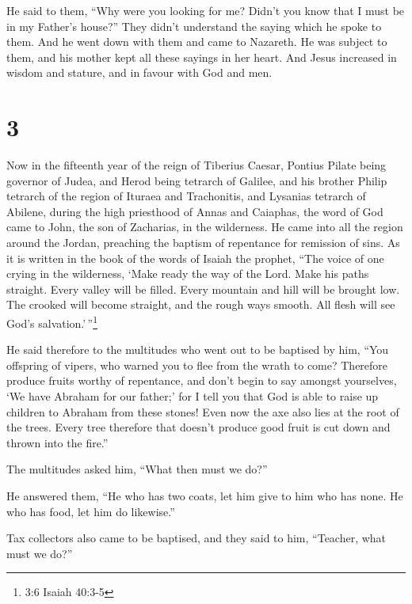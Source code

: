  He said to them, ``Why were you looking for me? Didn't you
know that I must be in my Father's house?''  They didn't
understand the saying which he spoke to them.  And he went
down with them and came to Nazareth. He was subject to them, and his
mother kept all these sayings in her heart.  And Jesus
increased in wisdom and stature, and in favour with God and men.

\hypertarget{section-2}{%
\section{3}\label{section-2}}

 Now in the fifteenth year of the reign of Tiberius Caesar,
Pontius Pilate being governor of Judea, and Herod being tetrarch of
Galilee, and his brother Philip tetrarch of the region of Ituraea and
Trachonitis, and Lysanias tetrarch of Abilene,  during the
high priesthood of Annas and Caiaphas, the word of God came to John, the
son of Zacharias, in the wilderness.  He came into all the
region around the Jordan, preaching the baptism of repentance for
remission of sins.  As it is written in the book of the
words of Isaiah the prophet, ``The voice of one crying in the
wilderness, `Make ready the way of the Lord. Make his paths straight.
 Every valley will be filled. Every mountain and hill will
be brought low. The crooked will become straight, and the rough ways
smooth.  All flesh will see God's salvation.'\,''\footnote{3:6
  Isaiah 40:3-5}

 He said therefore to the multitudes who went out to be
baptised by him, ``You offspring of vipers, who warned you to flee from
the wrath to come?  Therefore produce fruits worthy of
repentance, and don't begin to say amongst yourselves, `We have Abraham
for our father;' for I tell you that God is able to raise up children to
Abraham from these stones!  Even now the axe also lies at
the root of the trees. Every tree therefore that doesn't produce good
fruit is cut down and thrown into the fire.''

 The multitudes asked him, ``What then must we do?''

 He answered them, ``He who has two coats, let him give to
him who has none. He who has food, let him do likewise.''

 Tax collectors also came to be baptised, and they said to
him, ``Teacher, what must we do?''

